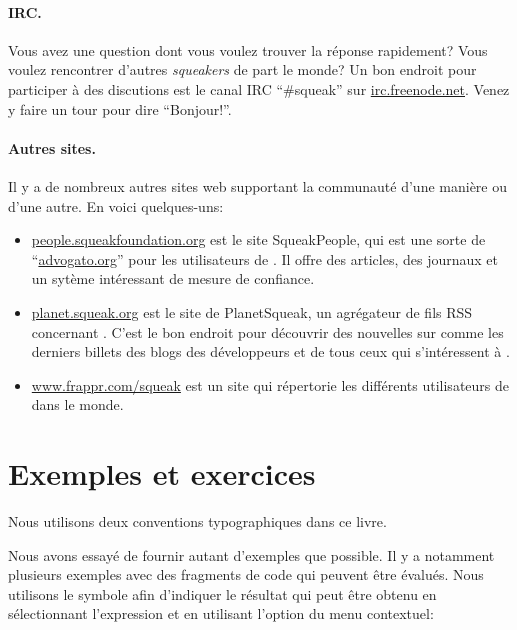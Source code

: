 \documentclass[a4paper,10pt,twoside]{book}
\begin{document}
\paragraph{IRC.}
Vous avez une question dont vous voulez trouver la r\'eponse
rapidement? Vous voulez rencontrer d'autres \emph{squeakers} de part
le monde? Un bon endroit pour participer \`a des discutions est le
canal IRC ``\#squeak'' sur \url{irc.freenode.net}. 
Venez y faire un tour pour dire ``Bonjour!''.

\paragraph{Autres sites.} Il y a de nombreux autres sites web supportant la communaut\'e \sq d'une mani\`ere ou d'une autre. En voici quelques-uns:
\begin{itemize}
  \item \url{people.squeakfoundation.org} est le site
    \textsf{SqueakPeople}, qui est une sorte de
    ``\url{advogato.org}'' pour les utilisateurs de \sq. Il offre des
    articles, des journaux et un syt\`eme int\'eressant de mesure de confiance.

  \item \url{planet.squeak.org} est le site de \textsf{PlanetSqueak},
    un agr\'egateur de fils RSS concernant \sq. C'est le bon endroit
    pour d\'ecouvrir des nouvelles sur \sq comme les derniers billets
    des blogs des d\'eveloppeurs et de tous ceux qui s'int\'eressent \`a \sq.

  \item \url{www.frappr.com/squeak} est un site qui r\'epertorie les
    diff\'erents utilisateurs de \sq dans le monde.

\end{itemize}


\section*{Exemples et exercices}

Nous utilisons deux conventions typographiques dans ce livre.

Nous avons essay\'e de fournir autant d'exemples que possible.
Il y a notamment plusieurs exemples avec des fragments de code qui
peuvent \^etre \'evalu\'es. Nous utilisons le symbole \ct{-->} afin
d'indiquer le r\'esultat qui peut \^etre obtenu en s\'electionnant
l'expression et en utilisant l'option  du menu contextuel:
\end{document}
